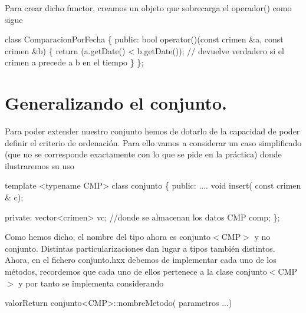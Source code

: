 Para crear dicho functor, creamos un objeto que sobrecarga el operador() como sigue


\begin{DoxyCode}
\textcolor{keyword}{class }ComparacionPorFecha \{
 \textcolor{keyword}{public}:
   \textcolor{keywordtype}{bool} operator()(\textcolor{keyword}{const} crimen &a, \textcolor{keyword}{const} crimen &b) \{
     \textcolor{keywordflow}{return} (a.getDate() < b.getDate()); \textcolor{comment}{// devuelve verdadero si el crimen a precede a b en el tiempo}
 \}
\};
\end{DoxyCode}
\hypertarget{index_generalizar}{}\section{Generalizando el conjunto.}\label{index_generalizar}
Para poder extender nuestro conjunto hemos de dotarlo de la capacidad de poder definir el criterio de ordenación. Para ello vamos a considerar un caso simplificado (que no se corresponde exactamente con lo que se pide en la práctica) donde ilustraremos su uso


\begin{DoxyCode}
\textcolor{keyword}{template} <\textcolor{keyword}{typename} CMP>
\textcolor{keyword}{class }conjunto \{
  \textcolor{keyword}{public}:
    ....
    \textcolor{keywordtype}{void} insert( \textcolor{keyword}{const} crimen & c);

  \textcolor{keyword}{private}:
    vector<crimen> vc; \textcolor{comment}{//donde se almacenan los datos}
    CMP comp;
\};
\end{DoxyCode}
 Como hemos dicho, el nombre del tipo ahora es conjunto$<$\-C\-M\-P$>$ y no conjunto. Distintas particularizaciones dan lugar a tipos también distintos. Ahora, en el fichero conjunto.\-hxx debemos de implementar cada uno de los métodos, recordemos que cada uno de ellos pertenece a la clase conjunto$<$\-C\-M\-P$>$ y por tanto se implementa considerando 
\begin{DoxyCode}
valorReturn conjunto<CMP>::nombreMetodo( parametros ...)
\end{DoxyCode}


